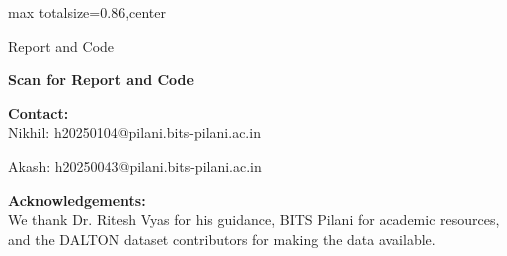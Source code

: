 \documentclass[12pt,a3paper]{article}
\begin{document}
\begin{adjustbox}{max totalsize={\textwidth}{0.86\textheight},center}
\begin{minipage}{\textwidth}
\begin{minipage}[t]{0.485\linewidth}
\begin{minipage}[t]{0.34\linewidth}
\begin{posterblock}{Report and Code}

\centering


\vspace{1.5mm}

{\scriptsize\bfseries
Scan for Report and Code
}

\vspace{2mm}

\raggedright
\scriptsize

\textbf{Contact:}\\
{
Nikhil: h20250104@pilani.bits-pilani.ac.in
}\par
{
Akash: h20250043@pilani.bits-pilani.ac.in
}

\vspace{2mm}

\textbf{Acknowledgements:}\\
We thank Dr. Ritesh Vyas for his guidance,
BITS Pilani for academic resources,
and the DALTON dataset contributors
for making the data available.

\end{posterblock}


\end{minipage}
\end{minipage}
\end{minipage}
\end{adjustbox}
\end{document}
